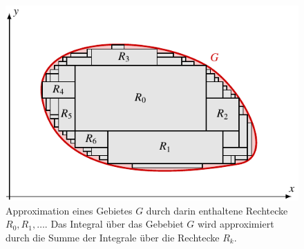 %
%
%
\begin{figure}
\centering
\includegraphics{chapters/040-felder/images/unterteilung.pdf}
\caption{Approximation eines Gebietes $G$ durch darin enthaltene Rechtecke
$R_0,R_1,\dots$.
Das Integral über das Gebebiet $G$ wird approximiert durch die Summe der
Integrale über die Rechtecke $R_k$.
\label{buch:felder:fig:unterteilung}}
\end{figure}
